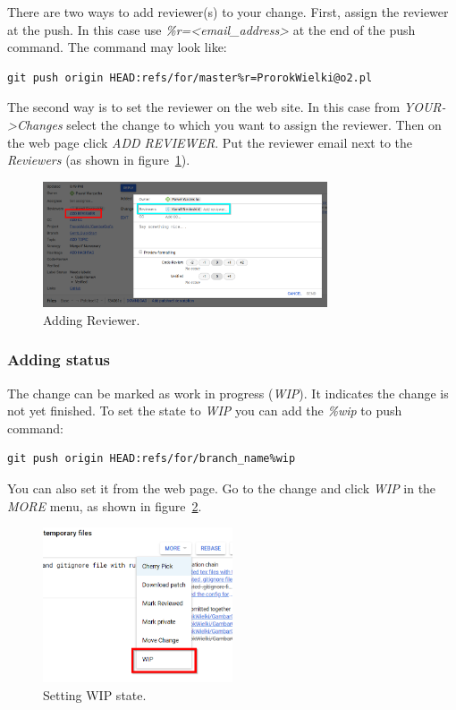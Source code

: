 \documentclass{article}
\begin{document}
There are two ways to add reviewer(s) to your change. First, assign the reviewer at the push. In this case use \textit{\%r=<email\_address>} at the end of the push command. The command may look like:

\begin{lstlisting}
git push origin HEAD:refs/for/master%r=ProrokWielki@o2.pl
\end{lstlisting}

The second way is to set the reviewer on the web site. In this case from \textit{YOUR->Changes} select the change to which you want to assign the reviewer. Then on the web page click \textit{ADD REVIEWER}. Put the reviewer email next to the \textit{Reviewers} (as shown in figure~\ref{fig:Reviewer}).

\begin{figure}[!ht]
  \centering
  \includegraphics[width=0.75\textwidth]{img/Reviewer}
  \caption{Adding Reviewer.}
  \label{fig:Reviewer}
\end{figure}


\subsubsection{Adding status}

The change can be marked as work in progress (\textit{WIP}). It indicates the change is not yet finished. To set the state to \textit{WIP} you can add the \textit{\%wip} to push command:

\begin{lstlisting}
git push origin HEAD:refs/for/branch_name%wip
\end{lstlisting}

You can also set it from the web page. Go to the change and click \textit{WIP} in the \textit{MORE} menu, as shown in figure~\ref{fig:WIP}.

\begin{figure}[!ht]
  \centering
  \includegraphics[width=0.5\textwidth]{img/WIP}
  \caption{Setting WIP state.}
  \label{fig:WIP}
\end{figure}
\end{document}
